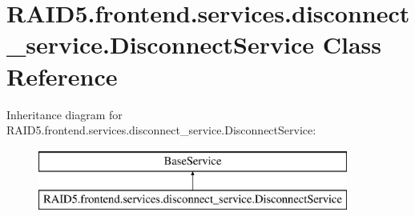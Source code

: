 \hypertarget{class_r_a_i_d5_1_1frontend_1_1services_1_1disconnect__service_1_1_disconnect_service}{}\section{R\+A\+I\+D5.\+frontend.\+services.\+disconnect\+\_\+service.\+Disconnect\+Service Class Reference}
\label{class_r_a_i_d5_1_1frontend_1_1services_1_1disconnect__service_1_1_disconnect_service}
Inheritance diagram for R\+A\+I\+D5.\+frontend.\+services.\+disconnect\+\_\+service.\+Disconnect\+Service\+:\begin{figure}[H]
\begin{center}
\leavevmode
\includegraphics[height=2.000000cm]{class_r_a_i_d5_1_1frontend_1_1services_1_1disconnect__service_1_1_disconnect_service}
\end{center}
\end{figure}
